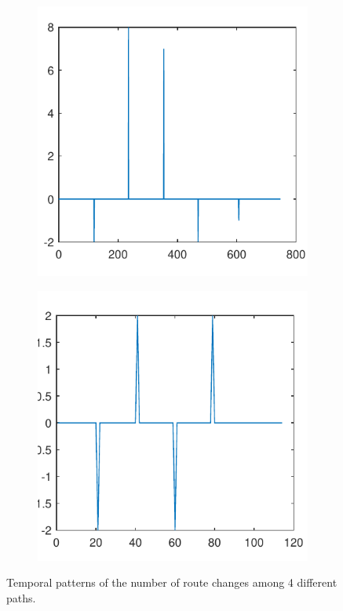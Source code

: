 \documentclass[sigconf]{acmart}
\begin{document}
\begin{figure}[!htp]
\begin{subfigure}[t]{0.45\linewidth}
			\label{fig:3.2b}
		\end{subfigure}
		\begin{subfigure}[t]{0.45\linewidth}
			\centering
			\includegraphics[width=0.95\linewidth]{fig/route_change_21}
			\label{fig:3.2c}
		\end{subfigure}
		\begin{subfigure}[t]{0.45\linewidth}
			\centering
			\includegraphics[width=0.95\linewidth]{fig/route_change_30}
			\label{fig:3.2d}
		\end{subfigure}
		\caption{Temporal patterns of the number of route changes among 4 different paths.}
		\label{fig:3.2}
	\end{figure}
	
\end{document}
